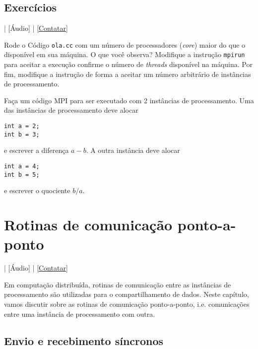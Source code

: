 \subsection*{Exercícios}

\begin{flushright}
  [Vídeo] | [Áudio] | \href{https://phkonzen.github.io/notas/contato.html}{[Contatar]}
\end{flushright}

\begin{exer}
  Rode o Código \verb+ola.cc+ com um número de processadores ({\it core}) maior do que o disponível em sua máquina. O que você observa? Modifique a instrução \verb+mpirun+ para aceitar a execução confirme o número de {\it threads} disponível na máquina. Por fim, modifique a instrução de forma a aceitar um número arbitrário de instâncias de processamento.
\end{exer}

\begin{exer}
  Faça um código MPI para ser executado com 2 instâncias de processamento. Uma das instâncias de processamento deve alocar
\begin{verbatim}
int a = 2;
int b = 3;
\end{verbatim}
e escrever a diferença $a-b$. A outra instância deve alocar
\begin{verbatim}
int a = 4;
int b = 5;
\end{verbatim}
e escrever o quociente $b/a$.
\end{exer}

\section {Rotinas de comunicação ponto-a-ponto}\label{cap_mpi_sec_p2pcom}

\begin{flushright}
  [Vídeo] | [Áudio] | \href{https://phkonzen.github.io/notas/contato.html}{[Contatar]}
\end{flushright}

Em computação distribuída, rotinas de comunicação entre as instâncias de processamento são utilizadas para o compartilhamento de dados. Neste capítulo, vamos discutir sobre as rotinas de comunicação ponto-a-ponto, i.e. comunicações entre uma instância de processamento com outra.

\subsection {Envio e recebimento síncronos}

